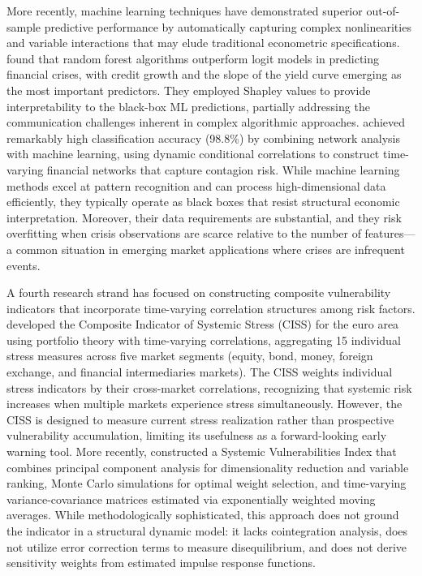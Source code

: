 \documentclass[12pt,a4paper]{article}
\numberwithin{equation}{section}
\theoremstyle{definition}
\theoremstyle{remark}
\begin{document}
More recently, machine learning techniques have demonstrated superior out-of-sample predictive performance by automatically capturing complex nonlinearities and variable interactions that may elude traditional econometric specifications. \textcite{buckmann2023credit} found that random forest algorithms outperform logit models in predicting financial crises, with credit growth and the slope of the yield curve emerging as the most important predictors. They employed Shapley values to provide interpretability to the black-box ML predictions, partially addressing the communication challenges inherent in complex algorithmic approaches. \textcite{lang2020machine} achieved remarkably high classification accuracy (98.8\%) by combining network analysis with machine learning, using dynamic conditional correlations to construct time-varying financial networks that capture contagion risk. While machine learning methods excel at pattern recognition and can process high-dimensional data efficiently, they typically operate as black boxes that resist structural economic interpretation. Moreover, their data requirements are substantial, and they risk overfitting when crisis observations are scarce relative to the number of features---a common situation in emerging market applications where crises are infrequent events.

A fourth research strand has focused on constructing composite vulnerability indicators that incorporate time-varying correlation structures among risk factors. \textcite{hollo2012ciss} developed the Composite Indicator of Systemic Stress (CISS) for the euro area using portfolio theory with time-varying correlations, aggregating 15 individual stress measures across five market segments (equity, bond, money, foreign exchange, and financial intermediaries markets). The CISS weights individual stress indicators by their cross-market correlations, recognizing that systemic risk increases when multiple markets experience stress simultaneously. However, the CISS is designed to measure current stress realization rather than prospective vulnerability accumulation, limiting its usefulness as a forward-looking early warning tool. More recently, \textcite{ayvazyan2025financial} constructed a Systemic Vulnerabilities Index that combines principal component analysis for dimensionality reduction and variable ranking, Monte Carlo simulations for optimal weight selection, and time-varying variance-covariance matrices estimated via exponentially weighted moving averages. While methodologically sophisticated, this approach does not ground the indicator in a structural dynamic model: it lacks cointegration analysis, does not utilize error correction terms to measure disequilibrium, and does not derive sensitivity weights from estimated impulse response functions.
\end{document}
